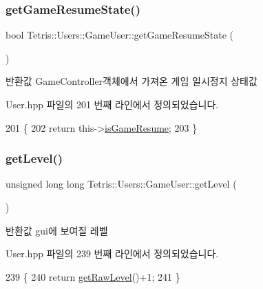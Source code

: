 \subsubsection{\texorpdfstring{get\+Game\+Resume\+State()}{getGameResumeState()}}
{\footnotesize\ttfamily bool Tetris\+::\+Users\+::\+Game\+User\+::get\+Game\+Resume\+State (\begin{DoxyParamCaption}{ }\end{DoxyParamCaption})\hspace{0.3cm}{\ttfamily [inline]}}

\begin{DoxyReturn}{반환값}
Game\+Controller객체에서 가져온 게임 일시정지 상태값 
\end{DoxyReturn}


User.\+hpp 파일의 201 번째 라인에서 정의되었습니다.


\begin{DoxyCode}
201                                      \{
202                 \textcolor{keywordflow}{return} this->\hyperlink{class_tetris_1_1_users_1_1_game_user_a7f1389568b9af1e543a54bedd2e39ffc}{isGameResume};
203             \}
\end{DoxyCode}
\mbox{\label{class_tetris_1_1_users_1_1_game_user_ae052e17a9bdcb0d8bc98c287592f7d7b}} 
\subsubsection{\texorpdfstring{get\+Level()}{getLevel()}}
{\footnotesize\ttfamily unsigned long long Tetris\+::\+Users\+::\+Game\+User\+::get\+Level (\begin{DoxyParamCaption}{ }\end{DoxyParamCaption})\hspace{0.3cm}{\ttfamily [inline]}}

\begin{DoxyReturn}{반환값}
gui에 보여질 레벨 
\end{DoxyReturn}


User.\+hpp 파일의 239 번째 라인에서 정의되었습니다.


\begin{DoxyCode}
239                                          \{
240                 \textcolor{keywordflow}{return} \hyperlink{class_tetris_1_1_users_1_1_game_user_a3e232d2f4a0610e51136bec11453858b}{getRawLevel}()+1;
241             \}
\end{DoxyCode}
\mbox{\label{class_tetris_1_1_users_1_1_game_user_a9300608a38f8a3b10f9d6b6bdaeaab18}} 
